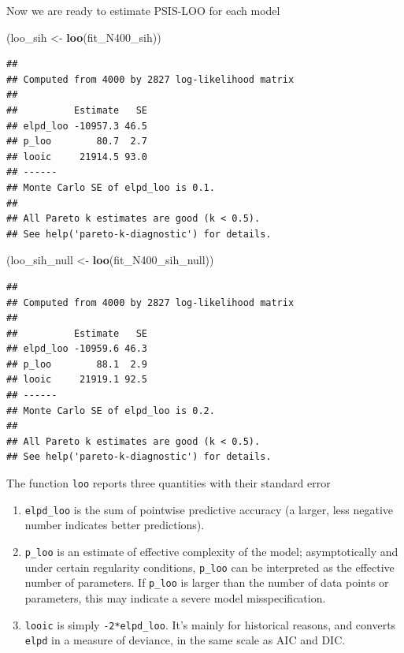 \documentclass[12pt,]{krantz}
\newenvironment{Shaded}{\begin{snugshade}}{\end{snugshade}}
\newcommand{\KeywordTok}[1]{\textcolor[rgb]{0.13,0.29,0.53}{\textbf{#1}}}
\newcommand{\StringTok}[1]{\textcolor[rgb]{0.31,0.60,0.02}{#1}}
\newcommand{\NormalTok}[1]{#1}
\providecommand{\tightlist}{%
  \setlength{\itemsep}{0pt}\setlength{\parskip}{0pt}}
\theoremstyle{definition}
\theoremstyle{definition}
\theoremstyle{definition}
\theoremstyle{remark}
\begin{document}
Now we are ready to estimate PSIS-LOO for each model

\begin{Shaded}
\begin{Highlighting}[]
\NormalTok{(loo_sih <-}\StringTok{ }\KeywordTok{loo}\NormalTok{(fit_N400_sih))}
\end{Highlighting}
\end{Shaded}

\begin{verbatim}
## 
## Computed from 4000 by 2827 log-likelihood matrix
## 
##          Estimate   SE
## elpd_loo -10957.3 46.5
## p_loo        80.7  2.7
## looic     21914.5 93.0
## ------
## Monte Carlo SE of elpd_loo is 0.1.
## 
## All Pareto k estimates are good (k < 0.5).
## See help('pareto-k-diagnostic') for details.
\end{verbatim}

\begin{Shaded}
\begin{Highlighting}[]
\NormalTok{(loo_sih_null <-}\StringTok{ }\KeywordTok{loo}\NormalTok{(fit_N400_sih_null))}
\end{Highlighting}
\end{Shaded}

\begin{verbatim}
## 
## Computed from 4000 by 2827 log-likelihood matrix
## 
##          Estimate   SE
## elpd_loo -10959.6 46.3
## p_loo        88.1  2.9
## looic     21919.1 92.5
## ------
## Monte Carlo SE of elpd_loo is 0.2.
## 
## All Pareto k estimates are good (k < 0.5).
## See help('pareto-k-diagnostic') for details.
\end{verbatim}

The function \texttt{loo} reports three quantities with their standard
error

\begin{enumerate}
\def\labelenumi{\arabic{enumi}.}
\tightlist
\item
  \texttt{elpd\_loo} is the sum of pointwise predictive accuracy (a
  larger, less negative number indicates better predictions).
\item
  \texttt{p\_loo} is an estimate of effective complexity of the model;
  asymptotically and under certain regularity conditions,
  \texttt{p\_loo} can be interpreted as the effective number of
  parameters. If \texttt{p\_loo} is larger than the number of data
  points or parameters, this may indicate a severe model
  misspecification.
\item
  \texttt{looic} is simply \texttt{-2*elpd\_loo}. It's mainly for
  historical reasons, and converts \texttt{elpd} in a measure of
  deviance, in the same scale as AIC and DIC.
\end{enumerate}
\end{document}
